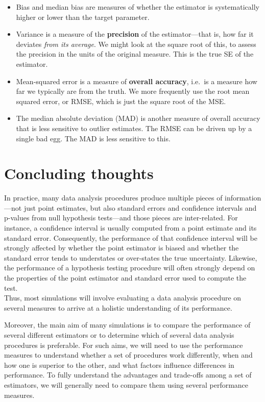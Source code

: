 \documentclass[
]{book}
\providecommand{\tightlist}{%
  \setlength{\itemsep}{0pt}\setlength{\parskip}{0pt}}
\begin{document}
\begin{itemize}
\tightlist
\item
  Bias and median bias are measures of whether the estimator is systematically higher or lower than the target parameter.
\item
  Variance is a measure of the \textbf{precision} of the estimator---that is, how far it deviates \emph{from its average}. We might look at the square root of this, to assess the precision in the units of the original measure. This is the true SE of the estimator.
\item
  Mean-squared error is a measure of \textbf{overall accuracy}, i.e.~is a measure how far we typically are from the truth. We more frequently use the root mean squared error, or RMSE, which is just the square root of the MSE.
\item
  The median absolute deviation (MAD) is another measure of overall accuracy that is less sensitive to outlier estimates. The RMSE can be driven up by a single bad egg. The MAD is less sensitive to this.
\end{itemize}

\section{Concluding thoughts}\label{concluding-thoughts}

In practice, many data analysis procedures produce multiple pieces of information---not just point estimates, but also standard errors and confidence intervals and p-values from null hypothesis tests---and those pieces are inter-related.
For instance, a confidence interval is usually computed from a point estimate and its standard error.
Consequently, the performance of that confidence interval will be strongly affected by whether the point estimator is biased and whether the standard error tends to understates or over-states the true uncertainty.
Likewise, the performance of a hypothesis testing procedure will often strongly depend on the properties of the point estimator and standard error used to compute the test.\\
Thus, most simulations will involve evaluating a data analysis procedure on several measures to arrive at a holistic understanding of its performance.

Moreover, the main aim of many simulations is to compare the performance of several different estimators or to determine which of several data analysis procedures is preferable.
For such aims, we will need to use the performance measures to understand whether a set of procedures work differently, when and how one is superior to the other, and what factors influence differences in performance.
To fully understand the advantages and trade-offs among a set of estimators, we will generally need to compare them using several performance measures.
\end{document}
